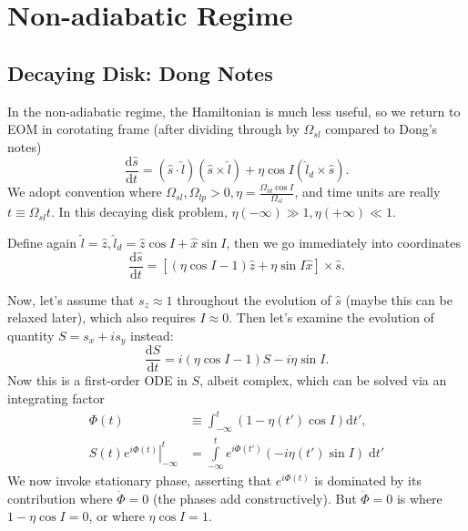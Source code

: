 \documentclass[11pt,
        usenames, %
        dvipsnames %
    ]{article}
\newcommand*{\rd}[2]{\frac{\mathrm{d}#1}{\mathrm{d}#2}}
\newcommand*{\at}[1]{\left.#1\right|}
\newcommand*{\p}[1]{\left(#1\right)}
\newcommand*{\s}[1]{\left[#1\right]}
\begin{document}
\section{Non-adiabatic Regime}

\subsection{Decaying Disk: Dong Notes}

In the non-adiabatic regime, the Hamiltonian is much less useful, so we return
to EOM in corotating frame (after dividing through by $\Omega_{sl}$ compared to
Dong's notes)
\begin{equation}
    \rd{\hat{s}}{t} = \p{\hat{s} \cdot \hat{l}}\p{\hat{s} \times \hat{l}}
        + \eta \cos I \p{\hat{l}_d \times \hat{s}}.
\end{equation}
We adopt convention where $\Omega_{sl}, \Omega_{lp} > 0, \eta =
\frac{\Omega_{ld}\cos I}{\Omega_{sl}}$, and time units are really $t \equiv
\Omega_{sl}t$. In this decaying disk problem, $\eta\p{-\infty} \gg 1,
\eta\p{+\infty} \ll 1$.

Define again $\hat{l} = \hat{z}, \hat{l}_d = \hat{z} \cos I + \hat{x}\sin I$,
then we go immediately into coordinates
\begin{equation}
    \rd{\hat{s}}{t} = \s{
        \p{\eta \cos I - 1}\hat{z} + \eta \sin I \hat{x}} \times \hat{s}.
\end{equation}

Now, let's assume that $s_z \approx 1$ throughout the evolution of $\hat{s}$
(maybe this can be relaxed later), which also requires $I \approx 0$. Then let's
examine the evolution of quantity $S = s_x + is_y$ instead:
\begin{equation}
    \rd{S}{t} = i\p{\eta\cos I - 1}S - i \eta \sin I.\label{eq:nonad_ode}
\end{equation}
Now this is a first-order ODE in $S$, albeit complex, which can be solved via
an integrating factor
\begin{align}
    \Phi(t) &\equiv \int_{-\infty}^t \p{1 - \eta(t') \cos I}
        \mathrm{d}t',\\
    \at{S(t) e^{i\Phi(t)}}_{-\infty}^t
        &= \int\limits_{-\infty}^t e^{i\Phi(t')}
            \p{-i\eta(t')\sin I}\;\mathrm{d}t'\label{eq:nonad_int}
\end{align}
We now invoke stationary phase, asserting that $e^{i\Phi(t)}$ is dominated by
its contribution where $\dot{\Phi} = 0$ (the phases add constructively). But
$\dot{\Phi} = 0$ is where $1 - \eta\cos I = 0$, or where $\eta\cos I = 1$.
\end{document}
